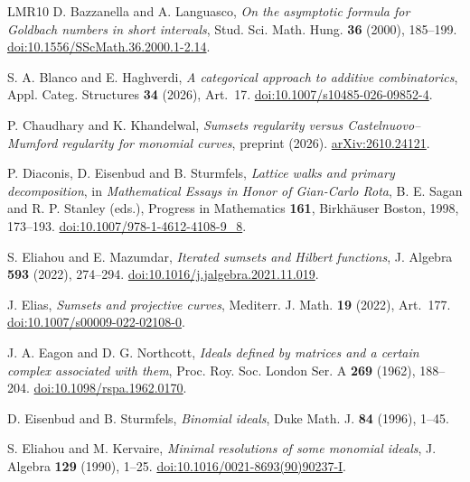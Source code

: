 \begin{thebibliography}{LMR10}
D. Bazzanella and A. Languasco,
\emph{On the asymptotic formula for Goldbach numbers in short intervals},
Stud. Sci. Math. Hung. \textbf{36} (2000), 185--199.
\href{https://doi.org/10.1556/SScMath.36.2000.1-2.14}{doi:10.1556/SScMath.36.2000.1-2.14}.

S. A. Blanco and E. Haghverdi,
\emph{A categorical approach to additive combinatorics},
Appl. Categ. Structures \textbf{34} (2026), Art.~17.
\href{https://doi.org/10.1007/s10485-026-09852-4}{doi:10.1007/s10485-026-09852-4}.

P. Chaudhary and K. Khandelwal,
\emph{Sumsets regularity versus Castelnuovo--Mumford regularity for monomial curves},
preprint (2026).
\href{https://arxiv.org/abs/2610.24121}{arXiv:2610.24121}.

P. Diaconis, D. Eisenbud and B. Sturmfels,
\emph{Lattice walks and primary decomposition},
in \emph{Mathematical Essays in Honor of Gian-Carlo Rota},
B. E. Sagan and R. P. Stanley (eds.),
Progress in Mathematics \textbf{161},
Birkh\"auser Boston, 1998, 173--193.
\href{https://doi.org/10.1007/978-1-4612-4108-9_8}{doi:10.1007/978-1-4612-4108-9\_8}.

S. Eliahou and E. Mazumdar,
\emph{Iterated sumsets and Hilbert functions},
J. Algebra \textbf{593} (2022), 274--294.
\href{https://doi.org/10.1016/j.jalgebra.2021.11.019}{doi:10.1016/j.jalgebra.2021.11.019}.

J. Elias,
\emph{Sumsets and projective curves},
Mediterr. J. Math. \textbf{19} (2022), Art.~177.
\href{https://doi.org/10.1007/s00009-022-02108-0}{doi:10.1007/s00009-022-02108-0}.

J. A. Eagon and D. G. Northcott,
\emph{Ideals defined by matrices and a certain complex associated with them},
Proc. Roy. Soc. London Ser. A \textbf{269} (1962), 188--204.
\href{https://doi.org/10.1098/rspa.1962.0170}{doi:10.1098/rspa.1962.0170}.

D. Eisenbud and B. Sturmfels,
\emph{Binomial ideals}, Duke Math. J. \textbf{84} (1996), 1--45.

S. Eliahou and M. Kervaire,
\emph{Minimal resolutions of some monomial ideals},
J. Algebra \textbf{129} (1990), 1--25.
\href{https://doi.org/10.1016/0021-8693(90)90237-I}{doi:10.1016/0021-8693(90)90237-I}.


\end{thebibliography}
